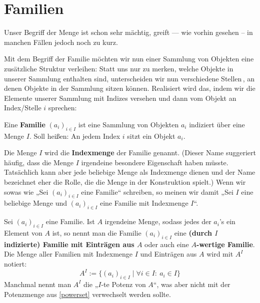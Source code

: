 \section{Familien}
Unser Begriff der Menge ist schon sehr mächtig, greift --- wie vorhin gesehen -- in manchen Fällen jedoch noch zu kurz.

Mit dem Begriff der Familie möchten wir nun einer Sammlung von Objekten eine zusätzliche Struktur verleihen: Statt uns nur zu merken, welche Objekte in unserer Sammlung enthalten sind, unterscheiden wir nun verschiedene \glqq Stellen\grqq\,, an denen Objekte in der Sammlung sitzen können. Realisiert wird das, indem wir die Elemente unserer Sammlung mit Indizes versehen und dann vom Objekt an Index/Stelle $i$ sprechen:

\begin{de}[Familien]
	Eine \textbf{Familie} $(a_i)_{i\in I}$ ist eine Sammlung von Objekten $a_i$ indiziert über eine Menge $I$. Soll heißen: An jedem Index $i$ sitzt ein Objekt $a_i$.
	
	Die Menge $I$ wird die \textbf{Indexmenge} der Familie genannt. (Dieser Name suggeriert häufig, dass die Menge $I$ irgendeine besondere Eigenschaft haben müsste. Tatsächlich kann aber jede beliebige Menge als Indexmenge dienen und der Name bezeichnet eher die Rolle, die die Menge in der Konstruktion spielt.) Wenn wir sowas wie „Sei $(a_i)_{i\in I}$ eine Familie“ schreiben, so meinen wir damit „Sei $I$ eine beliebige Menge und $(a_i)_{i\in I}$ eine Familie mit Indexmenge $I$“.
\end{de}



\begin{de} \label{familie}
 Sei $(a_i)_{i\in I}$ eine Familie. Ist $A$ irgendeine Menge, sodass jedes der $a_i$'s ein Element von $A$ ist, so nennt man die Familie $(a_i)_{i\in I}$ eine \textbf{(durch $I$ indizierte) Familie mit Einträgen aus $A$} oder auch eine \textbf{$A$-wertige Familie}. \\
 Die Menge aller Familien mit Indexmenge $I$ und Einträgen aus $A$ wird mit $A^I$ notiert:
 \[ A^I := \{ (a_i)_{i\in I} \mid \forall i\in I:\ a_i \in I \} \]
 Manchmal nennt man $A^I$ die „$I$-te Potenz von $A$“, was aber nicht mit der Potenzmenge aus \cref{powerset} verwechselt werden sollte.
\end{de}


